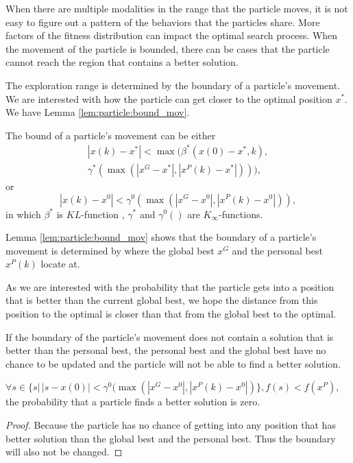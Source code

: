 When there are multiple modalities in the range that the particle moves, it is not easy to figure out a pattern of the behaviors that the particles share.
More factors of the fitness distribution can impact the optimal search process.
When the movement of the particle is bounded, there can be cases that the particle cannot reach the region that contains a better solution.

The exploration range is determined by the boundary of a particle's movement.
We are interested with how the particle can get closer to the optimal position $ x^{*} $.
We have Lemma \ref{lem:particle:bound_mov}.

\begin{mylem}
\label{lem:particle:bound_mov}
The bound of a particle's movement can be either 
\begin{equation}
\begin{aligned}
| x(k) - x^{*} | < \max ( \beta^{*} ( x(0) - x^{*}, k ), \\ \gamma^{*} ( \max ( | x^{G} - x^{*} | , | x^{P}(k) - x^{*}  | ) ) ),
\end{aligned}
\end{equation}
or 
\begin{equation}
| x(k) - x^{0} | < \gamma^{0} ( \max ( | x^{G} - x^{0} | , | x^{P}(k) - x^{0}  | ) ),
\end{equation}
in which $ \beta^{*} $ is $ KL $-function , $ \gamma^{*}  $ and $ \gamma^{0} () $ are $ K_{\infty} $-functions. 
\end{mylem}
Lemma \ref{lem:particle:bound_mov} shows that the boundary of a particle's movement is determined by where the global best $ x^{G} $ and the personal best $ x^{P}(k) $ locate at.

As we are interested with the probability that the particle gets into a position that is better than the current global best, we hope the distance from this position to the optimal is closer than that from the global best to the optimal.

If the boundary of the particle's movement does not contain a solution that is better than the personal best, the personal best and the global best have no chance to be updated and the particle will not be able to find a better solution.
\begin{mythm}
\label{thm:multimodal:out_of_scope}
$ \forall s \in \{ s | \, |s - x(0)| < \gamma^{0} ( \max ( | x^{G} - x^{0} | , | x^{P}(k) - x^{0}  | ) \}, f(s) < f(x^{P})  $, the probability that a particle finds a better solution is zero.
\begin{proof}
Because the particle has no chance of getting into any position that has better solution than the global best and the personal best.
Thus the boundary will also not be changed.
\end{proof}
\end{mythm}

